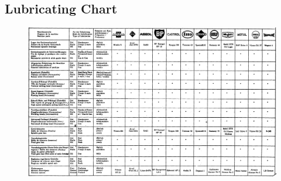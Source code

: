 \begin{landscape}
    \chapter{Lubricating Chart}

    \begin{figure}[ht]
        \centering
        \includegraphics[width=0.9\linewidth]{images/page_58_lubricating_chart}
        \label{fig:lubricating_chart}
    \end{figure}
\end{landscape}
\restoregeometry %